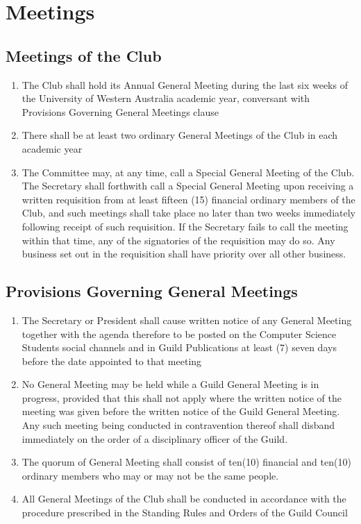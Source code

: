 \documentclass[10pt,a4paper]{report}
\begin{document}
	\chapter{Meetings}

	\section{Meetings of the Club}
	\begin{enumerate}[label=\alph*]
		\item The Club shall hold its Annual General Meeting during the last six weeks of the University of Western Australia academic year, conversant with Provisions Governing General Meetings clause
		\item There shall be at least two ordinary General Meetings of the Club in each academic year
		\item The Committee may, at any time, call a Special General Meeting of the Club. The Secretary shall forthwith call a Special General Meeting upon receiving a written requisition from at least fifteen (15) financial ordinary members of the Club, and such meetings shall take place no later than two weeks immediately following receipt of such requisition. If the Secretary fails to call the meeting within that time, any of the signatories of the requisition may do so. Any business set out in the requisition shall have priority over all other business.
	\end{enumerate}

	\section{Provisions Governing General Meetings}
	\begin{enumerate}[label=\alph*]
		\item The Secretary or President shall cause written notice of any General Meeting together with the agenda therefore to be posted on the Computer Science Students social channels and in Guild Publications at least (7) seven days before the date appointed to that meeting

		\item No General Meeting may be held while a Guild General Meeting is in progress, provided that this shall not apply where the written notice of the meeting was given before the written notice of the Guild General Meeting. Any such meeting being conducted in contravention thereof shall disband immediately on the order of a disciplinary officer of the Guild.

		\item The quorum of General Meeting shall consist of ten(10) financial and ten(10) ordinary members who may or may not be the same people.

		\item All General Meetings of the Club shall be conducted in accordance with the procedure prescribed in the Standing Rules and Orders of the Guild Council
	\end{enumerate}
\end{document}
